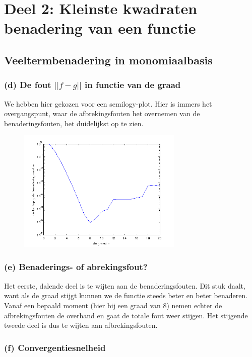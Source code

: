 \documentclass[11pt,a4paper]{article}
\begin{document}
\section{Deel 2: Kleinste kwadraten benadering van een functie}

\subsection{Veeltermbenadering in monomiaalbasis}

\subsubsection*{(d) De fout $||f-g||$ in functie van de graad}
We hebben hier gekozen voor een semilogy-plot. Hier is immers het overgangspunt, waar de afbrekingsfouten het overnemen van de benaderingsfouten, het duidelijkst op te zien.
\begin{figure}[H]
\vspace{-35pt}
	\centering
	\includegraphics[width=0.7\textwidth]{22d1.png}
	\vspace{-10pt}
	\end{figure}

\subsubsection*{(e) Benaderings- of abrekingsfout?}

Het eerste, dalende deel is te wijten aan de benaderingsfouten. Dit stuk daalt, want als de graad stijgt kunnen we de functie steeds beter en beter benaderen. Vanaf een bepaald moment (hier bij een graad van 8) nemen echter de afbrekingsfouten de overhand en gaat de totale fout weer stijgen. Het stijgende tweede deel is dus te wijten aan afbrekingsfouten.
\vspace{-20pt}
\subsubsection*{(f) Convergentiesnelheid}
\end{document}
